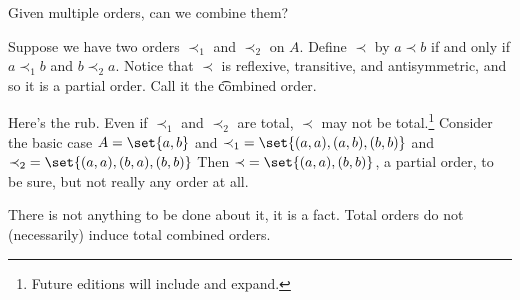 

Given multiple orders, can we combine them?


Suppose we have two orders $\prec_1$ and $\prec_2$ on $A$.
Define $\prec$ by $a \prec b$ if and only if $a \prec_1 b$ and $b \prec_2 a$.
Notice that $\prec$ is reflexive, transitive, and antisymmetric, and so it is a partial order.
Call it the \t{combined order}.

Here's the rub.
Even if $\prec_1$ and $\prec_2$ are total, $\prec$ may not be total.\footnote{Future editions will include and expand.}
Consider the basic case $A = \set{a, b}$ and $\prec_1 \; = \set{(a,a), (a, b), (b,b)}$ and $\prec_2 \; = \set{(a,a), (b,a), (b,b)}$
Then $\prec \; = \set{(a,a), (b,b)}$, a partial order, to be sure, but not really any order at all.

There is not anything to be done about it, it is a fact.
Total orders do not (necessarily) induce total combined orders.

\blankpage
